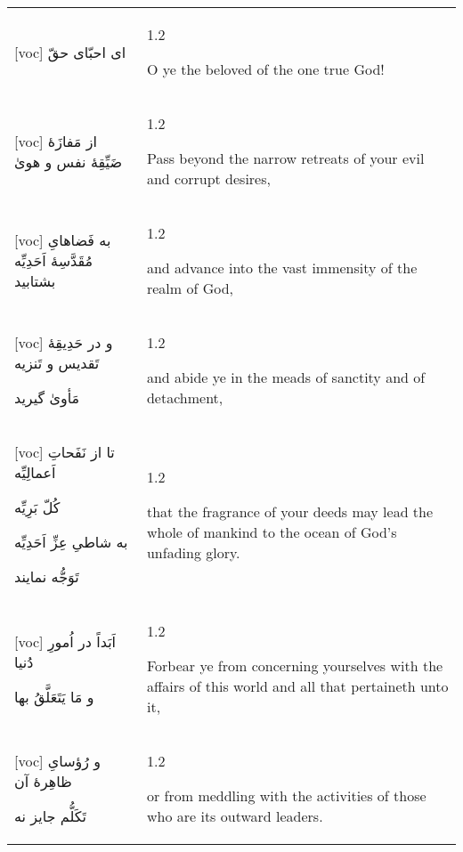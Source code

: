\documentclass[11pt]{article}
\makeatletter
\newenvironment{orig}
  {\begin{farsi}[voc]}
  {\end{farsi}}
\newenvironment{trans}
  {\Large\begin{spacing}{1.2}\raggedright}
  {\end{spacing}}
\newenvironment{word}
  {\begin{tabular}[t]{p{2.75in}@{\hspace{3em}}p{2.875in}}}
  {\end{tabular}}
\newcommand{\ayat}[2]{\begin{orig}#1\end{orig} & \begin{trans}#2\end{trans}}
\newcommand{\define}[3]{\textfarsi[voc]{\Huge
    \textbf{#1}}\hspace{3mm}{\headwordfont \large
    \textit{#2}}\hspace{3mm}{\Large #3} \\[3ex]}
\newcommand{\fulldefine}[3]{\textfarsi[voc]{\Huge
    \textbf{#1}}\hspace{3mm}{\headwordfont \large
    \textit{#2}}\vspace{-1ex}\begin{quote}\Large #3\end{quote}\vspace{1ex}}
\makeatother
\begin{document}
\begin{word}
\ayat{
ای احبّای حقّ
}{O ye the beloved of the one true God!} \vspace{-1ex}\\ \ayat{
از مَفازَۀ ضَیِّقِۀ نفس و هویٰ
}{Pass beyond the narrow retreats of your evil and corrupt desires,} \vspace{-1ex}\\ \ayat{
به فَضاهایِ مُقَدَّسِۀ اَحَدِیِّه بشتابید
}{and advance into the vast immensity of the realm of God,} \vspace{-1ex}\\ \ayat{
و در حَدِیقِۀ تَقدیس و تَنزیه

مَأویٰ گیرید
}{and abide ye in the meads of sanctity and of detachment,} \\ \ayat{
تا از نَفَحاتِ اَعمالِیِّه

کُلّ بَرِیِّه

به شاطیِ عِزِّ اَحَدِیِّه

تَوَجُّه نمایند
}{that the fragrance of your deeds may lead the whole of mankind to the ocean
  of God’s unfading glory.} \vspace{-1ex}\\ \ayat{
اَبَداً در اُمورِ دُنیا

و مَا یَتَعَلَّقُ بها
}{Forbear ye from concerning yourselves with the affairs of this world and all
  that pertaineth unto it,} \vspace{-1ex}\\ \ayat{
و رُؤسایِ ظاهِرۀ آن

تَکَلُّم جایز نه
}{or from meddling with the activities of those who are its outward leaders.}
\end{word}



\newpage
\end{document}
